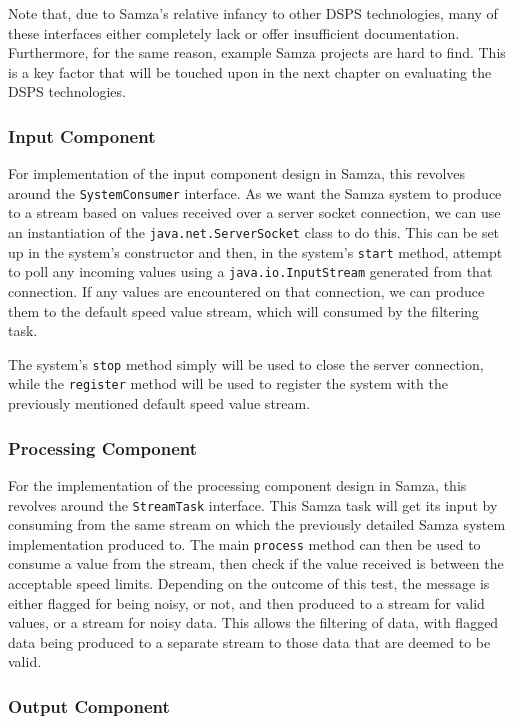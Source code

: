 Note that, due to Samza's relative infancy to other DSPS technologies, many of these interfaces either completely lack
or offer insufficient documentation. Furthermore, for the same reason, example Samza projects are hard to find. This is
a key factor that will be touched upon in the next chapter on evaluating the DSPS technologies.

\subsubsection{Input Component}

For implementation of the input component design in Samza, this revolves around the \texttt{SystemConsumer} interface.
As we want the Samza system to produce to a stream based on values received over a server socket connection, we can use
an instantiation of the \texttt{java.net.ServerSocket} class to do this. This can be set up in the system's constructor
and then, in the system's \texttt{start} method, attempt to poll any incoming values using a \texttt{java.io.InputStream} generated
from that connection. If any values are encountered on that connection, we can produce them to the default speed value
stream, which will consumed by the filtering task.

The system's \texttt{stop} method simply will be used to close the server connection, while the \texttt{register} method will
be used to register the system with the previously mentioned default speed value stream.

\subsubsection{Processing Component}

For the implementation of the processing component design in Samza, this revolves around the \texttt{StreamTask} interface.
This Samza task will get its input by consuming from the same stream on which the previously detailed Samza system implementation
produced to. The main \texttt{process} method can then be used to consume a value from the stream, then check if the value
received is between the acceptable speed limits. Depending on the outcome of this test, the message is either flagged for
being noisy, or not, and then produced to a stream for valid values, or a stream for noisy data. This allows the filtering
of data, with flagged data being produced to a separate stream to those data that are deemed to be valid.

\subsubsection{Output Component}

